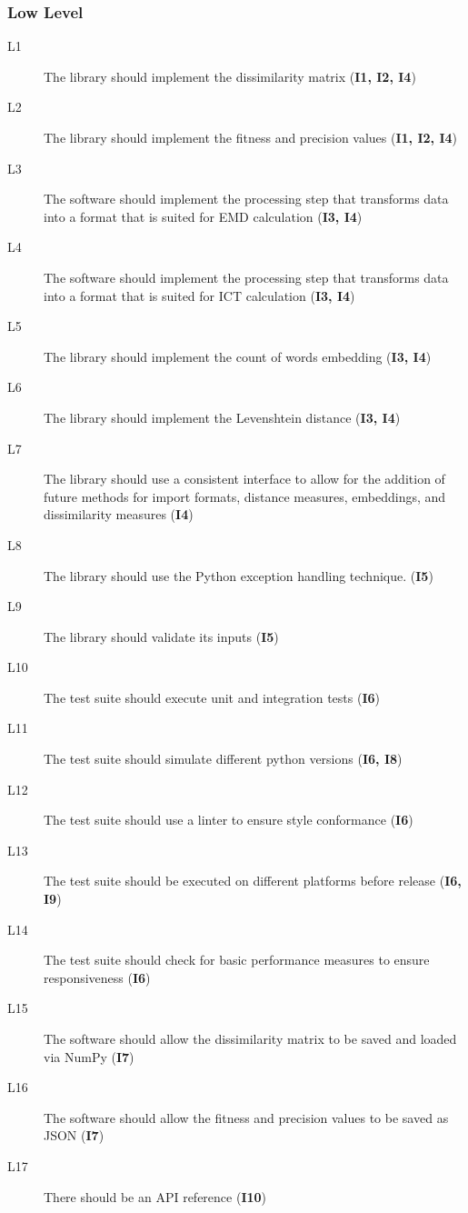 \documentclass{article}
\begin{document}
\subsubsection{Low Level}
\begin{description}
\item [L1] The library should implement the dissimilarity matrix (\textbf{I1, I2, I4})
\item [L2] The library should implement the fitness and precision values (\textbf{I1, I2, I4})
\item [L3] The software should implement the processing step that transforms data into a format that is suited for EMD calculation (\textbf{I3, I4})
\item [L4] The software should implement the processing step that transforms data into a format that is suited for ICT calculation (\textbf{I3, I4})
\item [L5] The library should implement the count of words embedding (\textbf{I3, I4})
\item [L6] The library should implement the Levenshtein distance (\textbf{I3, I4})
\item [L7] The library should use a consistent interface to allow for the addition of future methods for import formats, distance measures, embeddings, and dissimilarity measures (\textbf{I4})
\item [L8] The library should use the Python exception handling technique. (\textbf{I5})
\item [L9] The library should validate its inputs (\textbf{I5})
\item [L10] The test suite should execute unit and integration tests (\textbf{I6})
\item [L11] The test suite should simulate different python versions (\textbf{I6, I8})
\item [L12] The test suite should use a linter to ensure style conformance (\textbf{I6})
\item [L13] The test suite should be executed on different platforms before release (\textbf{I6, I9})
\item [L14] The test suite should check for basic performance measures to ensure responsiveness (\textbf{I6})
\item [L15] The software should allow the dissimilarity matrix to be saved and loaded via NumPy (\textbf{I7})
\item [L16] The software should allow the fitness and precision values to be saved as JSON (\textbf{I7})
\item [L17] There should be an API reference (\textbf{I10})

\end{description}
\end{document}
